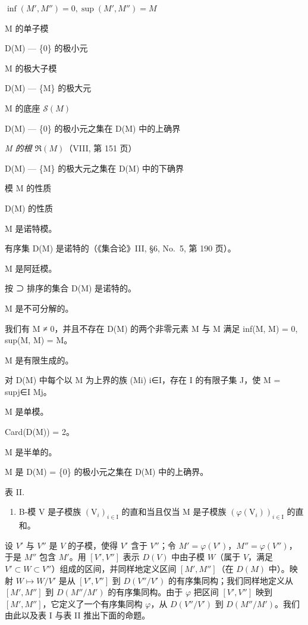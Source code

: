 \(\inf(M', M'') = 0, \sup(M', M'') = M\)

M 的单子模

D(M) --- \{0\} 的极小元

M 的极大子模

D(M) --- \{M\} 的极大元

M 的底座 \(\mathscr{S}(M)\)

D(M) --- \{0\} 的极小元之集在 D(M) 中的上确界

\emph{M 的根 \(\Re(M)\)}（VIII, 第 151 页）

D(M) --- \{M\} 的极大元之集在 D(M) 中的下确界

模 M 的性质

D(M) 的性质

M 是诺特模。

有序集 D(M) 是诺特的（《集合论》III, §6, No.~5, 第 190 页）。

M 是阿廷模。

按 ⊃ 排序的集合 D(M) 是诺特的。

M 是不可分解的。

我们有 M ≠ 0，并且不存在 D(M) 的两个非零元素 M\textquotesingle{} 与 M\textquotesingle\textquotesingle{} 满足 inf(M\textquotesingle, M\textquotesingle\textquotesingle) = 0, sup(M\textquotesingle, M\textquotesingle\textquotesingle) = M。

M 是有限生成的。

对 D(M) 中每个以 M 为上界的族 (Mi) i∈I，存在 I 的有限子集 J，使 M = supj∈I Mj。

M 是单模。

Card(D(M)) = 2。

M 是半单的。

M 是 D(M) = \{0\} 的极小元之集在 D(M) 中的上确界。

表 II.

\begin{enumerate}
\def\labelenumi{\alph{enumi})}
\setcounter{enumi}{2}
\tightlist
\item
  B-模 V 是子模族 \((\mathrm{V}_{i})_{i\in\mathrm{I}}\) 的直和当且仅当 M 是子模族 \((\varphi(\mathrm{V}_{i}))_{i\in\mathrm{I}}\) 的直和。
\end{enumerate}

设 \(V'\) 与 \(V''\) 是 \(V\) 的子模，使得 \(V'\) 含于 \(V''\)；令 \(M' = \varphi(V')\)，\(M'' = \varphi(V'')\)，于是 \(M''\) 包含 \(M'\)。用 \([V', V'']\) 表示 \(D(V)\) 中由子模 \(W\)（属于 \(V\)，满足 \(V' \subset W \subset V''\)）组成的区间，并同样地定义区间 \([M', M'']\)（在 \(D(M)\) 中）。映射 \(W \mapsto W/V'\) 是从 \([V', V'']\) 到 \(D(V''/V')\) 的有序集同构；我们同样地定义从 \([M', M'']\) 到 \(D(M''/M')\) 的有序集同构。由于 \(\varphi\) 把区间 \([V', V'']\) 映到 \([M', M'']\)，它定义了一个有序集同构 \(\varphi\)，从 \(D(V''/V')\) 到 \(D(M''/M')\)。我们由此以及表 I 与表 II 推出下面的命题。

